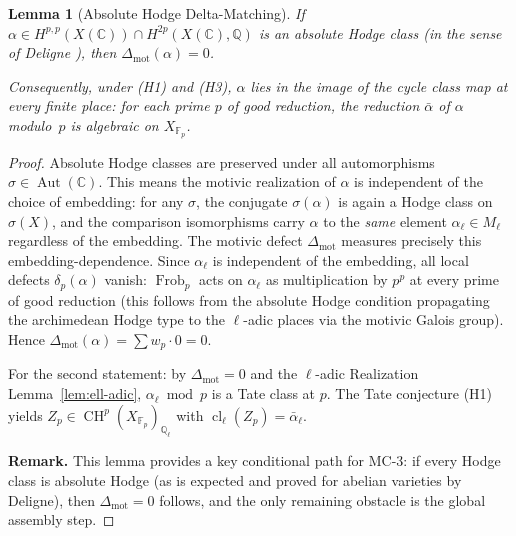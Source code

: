 \documentclass[11pt]{article}
\newtheorem{lemma}[theorem]{Lemma}
\theoremstyle{definition}
\DeclareMathOperator{\cl}{cl}
\DeclareMathOperator{\Frob}{Frob}
\DeclareMathOperator{\CH}{CH}
\DeclareMathOperator{\Aut}{Aut}
\begin{document}
\begin{lemma}[Absolute Hodge Delta-Matching]
\label{lem:abs-hodge-delta}
If $\alpha \in H^{p,p}(X(\mathbb{C})) \cap H^{2p}(X(\mathbb{C}), \mathbb{Q})$
is an absolute Hodge class (in the sense of Deligne \cite{Deligne}),
then $\Delta_{\mathrm{mot}}(\alpha) = 0$.

Consequently, under \emph{(H1)} and \emph{(H3)}, $\alpha$ lies in the
image of the cycle class map at every finite place: for each prime $p$ of
good reduction, the reduction $\bar{\alpha}$ of $\alpha$ modulo~$p$
is algebraic on $X_{\mathbb{F}_p}$.
\end{lemma}

\begin{proof}
Absolute Hodge classes are preserved under all automorphisms
$\sigma \in \Aut(\mathbb{C})$.  This means the motivic realization of
$\alpha$ is independent of the choice of embedding: for any
$\sigma$, the conjugate $\sigma(\alpha)$ is again a Hodge class on
$\sigma(X)$, and the comparison isomorphisms carry $\alpha$ to the
\emph{same} element $\alpha_\ell \in M_\ell$ regardless of the
embedding.  The motivic defect $\Delta_{\mathrm{mot}}$ measures
precisely this embedding-dependence.  Since $\alpha_\ell$ is
independent of the embedding, all local defects $\delta_p(\alpha)$
vanish: $\Frob_p$ acts on $\alpha_\ell$ as multiplication by $p^p$
at every prime of good reduction (this follows from the absolute
Hodge condition propagating the archimedean Hodge type to the
$\ell$-adic places via the motivic Galois group).  Hence
$\Delta_{\mathrm{mot}}(\alpha) = \sum w_p \cdot 0 = 0$.

For the second statement: by $\Delta_{\mathrm{mot}} = 0$ and the
$\ell$-adic Realization Lemma~\ref{lem:ell-adic}, $\alpha_\ell \bmod p$
is a Tate class at $p$.  The Tate conjecture (H1) yields
$Z_p \in \CH^p(X_{\mathbb{F}_p})_{\mathbb{Q}_\ell}$ with
$\cl_\ell(Z_p) = \bar{\alpha}_\ell$.

\smallskip\noindent\textbf{Remark.}
This lemma provides a key conditional path for MC-3: if every Hodge
class is absolute Hodge (as is expected and proved for abelian varieties
by Deligne), then $\Delta_{\mathrm{mot}} = 0$ follows, and the only
remaining obstacle is the global assembly step.
\end{proof}
\end{document}
